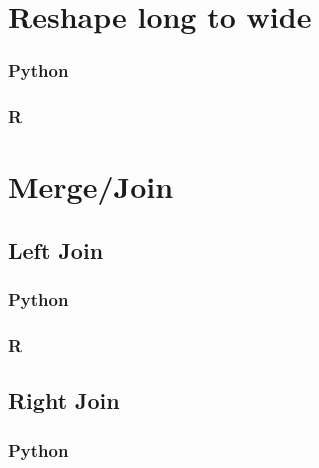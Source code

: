 \documentclass[
]{book}
\begin{document}
\hypertarget{reshape-long-to-wide}{%
\section{Reshape long to wide}\label{reshape-long-to-wide}}

\hypertarget{python-26}{%
\subsubsection*{Python}\label{python-26}}

\hypertarget{r-26}{%
\subsubsection*{R}\label{r-26}}

\hypertarget{mergejoin}{%
\section{Merge/Join}\label{mergejoin}}

\hypertarget{left-join}{%
\subsection{Left Join}\label{left-join}}

\hypertarget{python-27}{%
\subsubsection*{Python}\label{python-27}}

\hypertarget{r-27}{%
\subsubsection*{R}\label{r-27}}

\hypertarget{right-join}{%
\subsection{Right Join}\label{right-join}}

\hypertarget{python-28}{%
\subsubsection*{Python}\label{python-28}}
\end{document}
